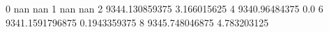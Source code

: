 0 nan nan
1 nan nan
2 9344.130859375 3.166015625
4 9340.96484375 0.0
6 9341.1591796875 0.1943359375
8 9345.748046875 4.783203125
